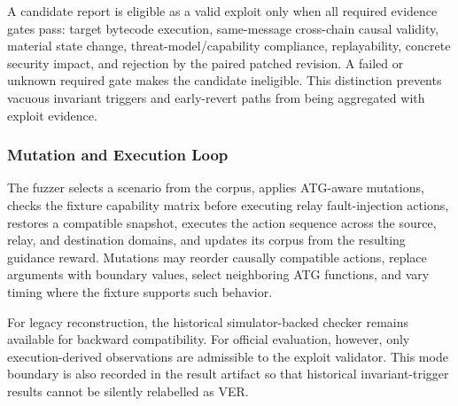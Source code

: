 A candidate report is eligible as a valid exploit only when all required evidence gates pass: target bytecode execution, same-message cross-chain causal validity, material state change, threat-model/capability compliance, replayability, concrete security impact, and rejection by the paired patched revision. A failed or unknown required gate makes the candidate ineligible. This distinction prevents vacuous invariant triggers and early-revert paths from being aggregated with exploit evidence.

\subsubsection{Mutation and Execution Loop}

The fuzzer selects a scenario from the corpus, applies ATG-aware mutations, checks the fixture capability matrix before executing relay fault-injection actions, restores a compatible snapshot, executes the action sequence across the source, relay, and destination domains, and updates its corpus from the resulting guidance reward. Mutations may reorder causally compatible actions, replace arguments with boundary values, select neighboring ATG functions, and vary timing where the fixture supports such behavior.

For legacy reconstruction, the historical simulator-backed checker remains available for backward compatibility. For official evaluation, however, only execution-derived observations are admissible to the exploit validator. This mode boundary is also recorded in the result artifact so that historical invariant-trigger results cannot be silently relabelled as VER.
